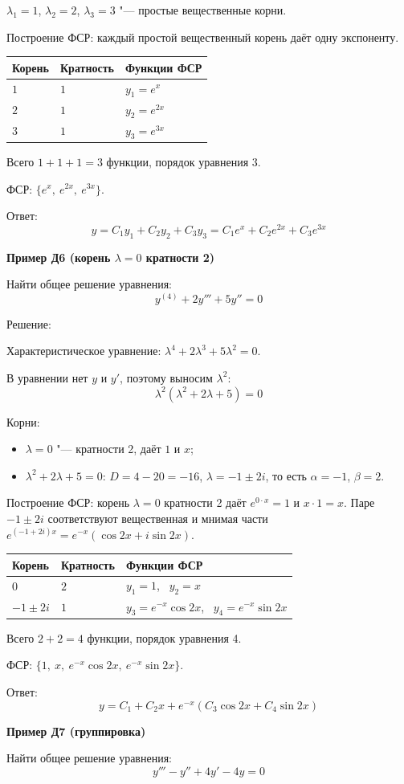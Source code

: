 \documentclass[11pt,a4paper]{article}
\makeatletter
\newcommand{\example}[1]{\par\medskip\noindent\textbf{#1}\par\nopagebreak\smallskip}
\newenvironment{fsrtable}{\begin{center}\begin{tabular}{@{}lll@{}}\toprule
Корень & Кратность & Функции ФСР\\\midrule}{\\\bottomrule\end{tabular}\end{center}}
\makeatother
\begin{document}
$\lambda_1 = 1$, $\lambda_2 = 2$, $\lambda_3 = 3$ "--- простые вещественные корни.

Построение ФСР: каждый простой вещественный корень даёт одну экспоненту.
\begin{fsrtable}
$1$ & $1$ & $y_1 = e^{x}$\\
$2$ & $1$ & $y_2 = e^{2x}$\\
$3$ & $1$ & $y_3 = e^{3x}$
\end{fsrtable}

Всего $1 + 1 + 1 = 3$ функции, порядок уравнения 3.

ФСР: $\{e^{x},\ e^{2x},\ e^{3x}\}$.

Ответ:
\[
  y = C_1 y_1 + C_2 y_2 + C_3 y_3 = C_1 e^{x} + C_2 e^{2x} + C_3 e^{3x}
\]

\example{Пример Д6 (корень $\lambda = 0$ кратности 2)}

Найти общее решение уравнения:
\[
  y^{(4)} + 2y''' + 5y'' = 0
\]

Решение:

Характеристическое уравнение: $\lambda^4 + 2\lambda^3 + 5\lambda^2 = 0$.

В уравнении нет $y$ и $y'$, поэтому выносим $\lambda^2$:
\[
  \lambda^2(\lambda^2 + 2\lambda + 5) = 0
\]

Корни:
\begin{itemize}
  \item $\lambda = 0$ "--- кратности 2, даёт $1$ и $x$;
  \item $\lambda^2 + 2\lambda + 5 = 0$: $D = 4 - 20 = -16$, $\lambda = -1 \pm 2i$, то есть $\alpha = -1$, $\beta = 2$.
\end{itemize}

Построение ФСР: корень $\lambda = 0$ кратности 2 даёт $e^{0 \cdot x} = 1$ и $x \cdot 1 = x$. Паре $-1 \pm 2i$ соответствуют вещественная и мнимая части $e^{(-1 + 2i)x} = e^{-x}(\cos 2x + i\sin 2x)$.
\begin{fsrtable}
$0$ & $2$ & $y_1 = 1$, \ $y_2 = x$\\
$-1 \pm 2i$ & $1$ & $y_3 = e^{-x}\cos 2x$, \ $y_4 = e^{-x}\sin 2x$
\end{fsrtable}

Всего $2 + 2 = 4$ функции, порядок уравнения 4.

ФСР: $\{1,\ x,\ e^{-x}\cos 2x,\ e^{-x}\sin 2x\}$.

Ответ:
\[
  y = C_1 + C_2 x + e^{-x}(C_3\cos 2x + C_4\sin 2x)
\]

\example{Пример Д7 (группировка)}

Найти общее решение уравнения:
\[
  y''' - y'' + 4y' - 4y = 0
\]
\end{document}
